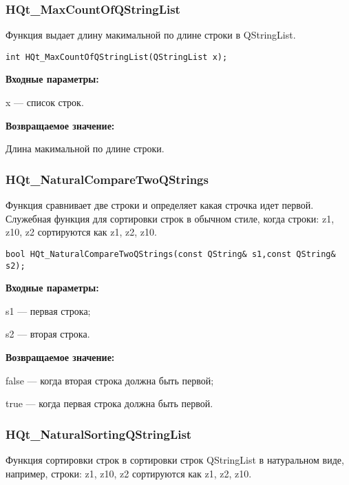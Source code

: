 \documentclass[a4paper,12pt]{article}
\begin{document}
\subsubsection{HQt\_MaxCountOfQStringList}\label{HQt_MaxCountOfQStringList}

Функция выдает длину макимальной по длине строки в QStringList.


\begin{lstlisting}[label=code_syntax_HQt_MaxCountOfQStringList,caption=Синтаксис]
int HQt_MaxCountOfQStringList(QStringList x);
\end{lstlisting}

\textbf{Входные параметры:}
 
x --- список строк.

\textbf{Возвращаемое значение:}

Длина макимальной по длине строки.


\subsubsection{HQt\_NaturalCompareTwoQStrings}\label{HQt_NaturalCompareTwoQStrings}

Функция сравнивает две строки и определяет какая строчка идет первой. Служебная функция для сортировки строк в обычном стиле, когда строки: z1, z10, z2 сортируются как z1, z2, z10.


\begin{lstlisting}[label=code_syntax_HQt_NaturalCompareTwoQStrings,caption=Синтаксис]
bool HQt_NaturalCompareTwoQStrings(const QString& s1,const QString& s2);
\end{lstlisting}

\textbf{Входные параметры:}

     s1 --- первая строка;
	 
     s2 --- вторая строка.

\textbf{Возвращаемое значение:}
 
false --- когда вторая строка должна быть первой;

true --- когда первая строка должна быть первой.


\subsubsection{HQt\_NaturalSortingQStringList}\label{HQt_NaturalSortingQStringList}

Функция сортировки строк в сортировки строк QStringList в натуральном виде, например, строки: z1, z10, z2 сортируются как z1, z2, z10.
\end{document}

